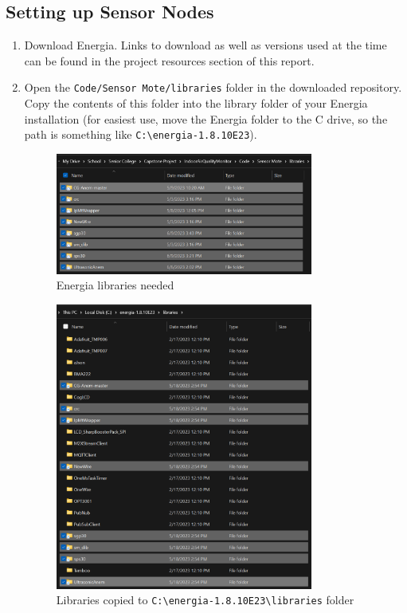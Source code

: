 \subsection{Setting up Sensor Nodes}
\begin{enumerate}
\item Download Energia. Links to download as well as versions used at the time can be found in the project resources section of this report.
\item Open the \texttt{Code/Sensor Mote/libraries} folder in the downloaded repository. Copy the contents of this folder into the library folder of your Energia installation (for easiest use, move the Energia folder to the C drive, so the path is something like \texttt{C:\textbackslash energia-1.8.10E23}).

\begin{figure}[H]
    \centering
    \includegraphics[width=0.8\textwidth]{Pictures/Libraries to copy.png}
    \caption[Energia libraries needed]{Energia libraries needed} 
    \label{fig:part1commrin}
\end{figure}

\begin{figure}[H]
    \centering
    \includegraphics[width=0.8\textwidth]{Pictures/Libraries copied.png}
    \caption[Libraries copied]{Libraries copied to \texttt{C:\textbackslash energia-1.8.10E23\textbackslash libraries} folder} 
    \label{fig:part1commrin}
\end{figure}


\end{enumerate}
